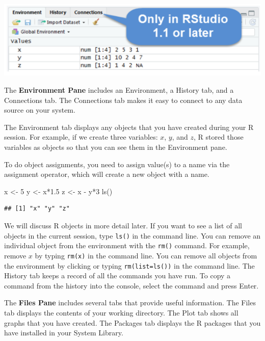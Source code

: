 \documentclass[
]{book}
\newenvironment{Shaded}{\begin{snugshade}}{\end{snugshade}}
\newcommand{\DecValTok}[1]{\textcolor[rgb]{0.00,0.00,0.81}{#1}}
\newcommand{\FloatTok}[1]{\textcolor[rgb]{0.00,0.00,0.81}{#1}}
\newcommand{\FunctionTok}[1]{\textcolor[rgb]{0.00,0.00,0.00}{#1}}
\newcommand{\NormalTok}[1]{#1}
\newcommand{\OtherTok}[1]{\textcolor[rgb]{0.56,0.35,0.01}{#1}}
\newcommand{\SpecialCharTok}[1]{\textcolor[rgb]{0.00,0.00,0.00}{#1}}
\begin{document}
\includegraphics[width=8.12in]{png/Rstudio3}

The \textbf{Environment Pane} includes an Environment, a History tab, and a Connections tab. The Connections tab makes it easy to connect to any data source on your system.

The Environment tab displays any objects that you have created during your R session. For example, if we create three variables: \(x\), \(y\), and \(z\), R stored those variables as objects so that you can see them in the Environment pane.

To do object assignments, you need to assign value(s) to a name via the assignment operator, which will create a new object with a name.

\begin{Shaded}
\begin{Highlighting}[]
\NormalTok{x }\OtherTok{\textless{}{-}} \DecValTok{5}
\NormalTok{y }\OtherTok{\textless{}{-}}\NormalTok{ x}\SpecialCharTok{*}\FloatTok{1.5}
\NormalTok{z }\OtherTok{\textless{}{-}}\NormalTok{ x }\SpecialCharTok{{-}}\NormalTok{ y}\SpecialCharTok{*}\DecValTok{3}
\FunctionTok{ls}\NormalTok{()}
\end{Highlighting}
\end{Shaded}

\begin{verbatim}
## [1] "x" "y" "z"
\end{verbatim}

We will discuss R objects in more detail later. If you want to see a list of all objects in the current session, type \texttt{ls()} in the command line. You can remove an individual object from the environment with the \texttt{rm()} command. For example, remove \(x\) by typing \texttt{rm(x)} in the command line. You can remove all objects from the environment by clicking or typing \texttt{rm(list=ls())} in the command line. The History tab keeps a record of all the commands you have run. To copy a command from the history into the console, select the command and press Enter.

The \textbf{Files Pane} includes several tabs that provide useful information. The Files tab displays the contents of your working directory. The Plot tab shows all graphs that you have created. The Packages tab displays the R packages that you have installed in your System Library.
\end{document}
